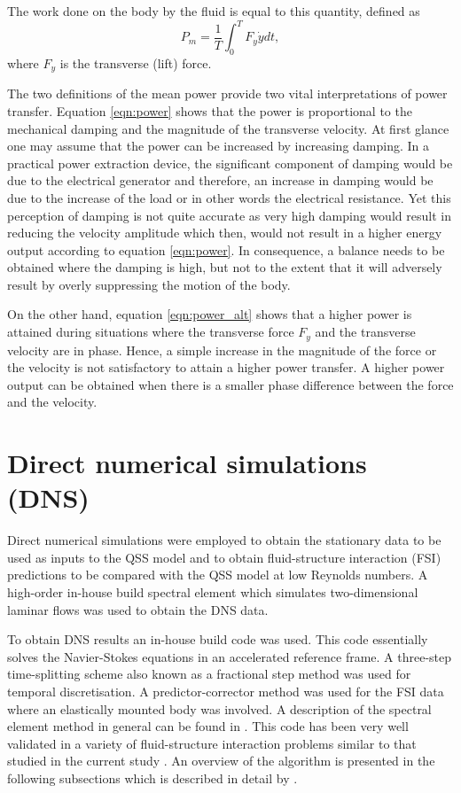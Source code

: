 The work done on the body by the fluid is equal to this quantity, defined as
\begin{equation}
\label{eqn:power_alt}
P_{m}=\frac{1}{T}\int_{0}^{T}F_y\dot{y} dt,
\end{equation}
where $F_y$ is the transverse (lift) force.

The two definitions of the mean power provide two vital interpretations of power transfer. Equation \ref{eqn:power} shows that the power is proportional to the mechanical damping and the magnitude of the transverse velocity. At first glance one may assume that the power can be increased by increasing damping. In a practical power extraction device, the significant component of damping would be due to the electrical generator and therefore, an increase in damping would be due to the increase of the load or in other words the electrical resistance. Yet this perception of damping is not quite accurate as very high damping would result in reducing the velocity amplitude which then, would not result in a higher energy output according to equation \ref{eqn:power}. In consequence, a balance needs to be obtained where the damping is high, but not to the extent that it will adversely result by overly suppressing the motion of the body.  

On the other hand, equation \ref{eqn:power_alt} shows that a higher power is attained during situations where the transverse force $F_{y}$ and the transverse velocity are in phase. Hence, a simple increase in the magnitude of the force or the velocity is not satisfactory to attain a higher power transfer. A higher power output can be obtained when there is a smaller phase difference between the force and the velocity.   



\section{Direct numerical simulations (DNS)}

Direct numerical simulations were employed to obtain the stationary data to be used as inputs to the QSS model and to obtain  fluid-structure interaction (FSI) predictions to be compared with the QSS model at low Reynolds numbers. A high-order in-house build spectral element which simulates two-dimensional laminar flows was used to obtain the DNS data.


To obtain DNS results an in-house build code was used. This code essentially solves the Navier-Stokes equations in an accelerated reference frame. A three-step time-splitting scheme also known as a fractional step method was used for temporal discretisation. A predictor-corrector method was used for the FSI data where an elastically mounted body was involved. A description of the spectral element method in general can be found in \citet{karniadakis2005}. This code has been very well validated in a variety of fluid-structure interaction problems similar to that studied in the current study \citep{Leontini2007a,Griffith2011,Leontini2011,Leontini2013}. An overview of the algorithm is presented in the following subsections which is described in detail by \citet{Leontini:thesis}. 


